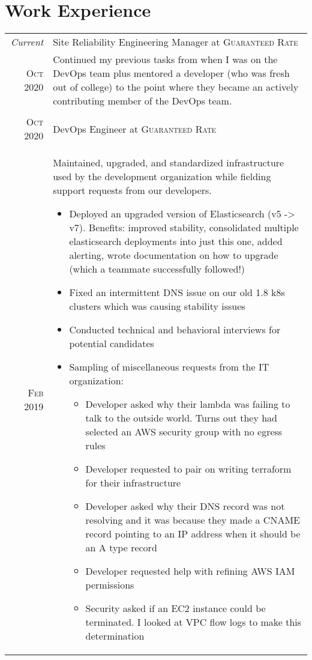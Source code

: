 \documentclass[a4paper,10pt]{article}
\begin{document}
\section{Work Experience}
\begin{tabular}{r|p{13cm}}
 \emph{Current} & Site Reliability Engineering Manager at \textsc{Guaranteed Rate} \\
 \textsc{Oct 2020} &
 \footnotesize{Continued my previous tasks from when I was on the DevOps team plus mentored a developer (who was fresh out of college) to the point where they became an actively contributing member of the DevOps team.} 
 \\
 \multicolumn{2}{c}{} \\ 
 \textsc{Oct 2020} & DevOps Engineer at \textsc{Guaranteed Rate} \\
 \textsc{Feb 2019} &
 \footnotesize{Maintained, upgraded, and standardized infrastructure used by the development organization while fielding support requests from our developers.} 
 \begin{itemize}
 \item \footnotesize{Deployed an upgraded version of Elasticsearch (v5 -> v7). Benefits: improved stability, consolidated multiple elasticsearch deployments into just this one, added alerting, wrote documentation on how to upgrade (which a teammate successfully followed!)}
 \item \footnotesize{Fixed an intermittent DNS issue on our old 1.8 k8s clusters which was causing stability issues}
 \item \footnotesize{Conducted technical and behavioral interviews for potential candidates}
 \item \footnotesize{Sampling of miscellaneous requests from the IT organization:}
   \begin{itemize}
   \item \footnotesize{Developer asked why their lambda was failing to talk to the outside world. Turns out they had selected an AWS security group with no egress rules}
   \item \footnotesize{Developer requested to pair on writing terraform for their infrastructure}
   \item \footnotesize{Developer asked why their DNS record was not resolving and it was because they made a CNAME record pointing to an IP address when it should be an A type record}
   \item \footnotesize{Developer requested help with refining AWS IAM permissions}
   \item \footnotesize{Security asked if an EC2 instance could be terminated. I looked at VPC flow logs to make this determination}

\end{itemize}
\end{itemize}
\end{tabular}
\end{document}
